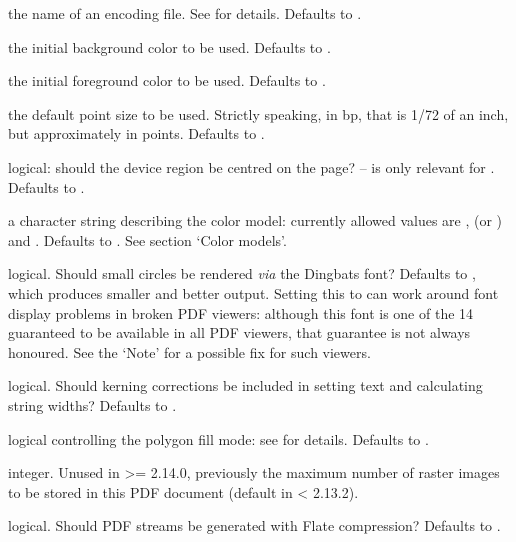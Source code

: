 \begin{Arguments}
\begin{ldescription}
\item[\code{encoding}] the name of an encoding file.  See
 for details.  Defaults to .
\item[\code{bg}] the initial background color to be used.  Defaults to
.
\item[\code{fg}] the initial foreground color to be used.  Defaults to
.
\item[\code{pointsize}] the default point size to be used.  Strictly
speaking, in bp, that is 1/72 of an inch, but approximately in
points.  Defaults to .
\item[\code{pagecentre}] logical: should the device region be centred on the
page? -- is only relevant for .  
Defaults to .
\item[\code{colormodel}] a character string describing the color model:
currently allowed values are ,  (or
) and .  Defaults to .  See section
`Color models'.
\item[\code{useDingbats}] logical.  Should small circles be rendered
\emph{via} the Dingbats font?  Defaults to , which produces
smaller and better output.  Setting this to  can work
around font display problems in broken PDF viewers: although this
font is one of the 14 guaranteed to be available in all PDF viewers,
that guarantee is not always honoured.
See the `Note' for a possible fix for such viewers.

\item[\code{useKerning}] logical.  Should kerning corrections be included in
setting text and calculating string widths?  Defaults to .
\item[\code{fillOddEven}] logical controlling the polygon fill mode:  see
 for details.  Defaults to .
\item[\code{maxRasters}] integer.  Unused in \R{} >= 2.14.0, previously the
maximum number of raster images to be stored in this PDF document
(default  in \R{} < 2.13.2).
\item[\code{compress}] logical.  Should PDF streams be generated with Flate
compression?  Defaults to .
\end{ldescription}
\end{Arguments}
%
